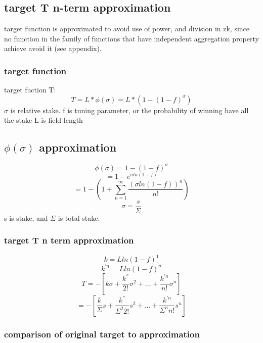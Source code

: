\documentclass{article}
\begin{document}
\subsection{ target T n-term approximation }
target function is approximated to avoid use of power, and division in zk, since no function in the family of functions that have independent aggregation property achieve avoid it (see appendix).

\subsubsection{ target function}

 target fuction T: $$ T = L * \phi(\sigma) = L * (1- (1 - f)^{\sigma}) $$
 $\sigma$ is relative stake.
 f is tuning parameter, or the probability of winning have all the stake
 L is field length

\subsection{ $\phi(\sigma)$ approximation}

 $$\phi(\sigma) = 1 - (1-f)^{\sigma} $$
 $$ = 1 - e^{\sigma ln(1-f)} $$
 $$ = 1 - (1 + \sum_{n=1}^{\infty}\frac{(\sigma ln (1-f))^n}{n!}) $$
 $$ \sigma = \frac{s}{\Sigma} $$
 s is stake, and $\Sigma$ is total stake.

\subsubsection{ target T n term approximation}

 $$ k = L ln (1-f)^1 $$
 $$ k^{'n} =  L ln (1-f)^n $$
 $$ T = -[k\sigma + \frac{k^{''}}{2!} \sigma^2 + \dots +\frac{ k^{'n}}{n!}\sigma^n] $$
 $$  = -[\frac{k}{\Sigma}s + \frac{k^{''}}{\Sigma^2 2!} s^2 + \dots +\frac{k^{'n}}{\Sigma^n n!} s^n] $$

\subsubsection{ comparison of original target to approximation }
\end{document}

